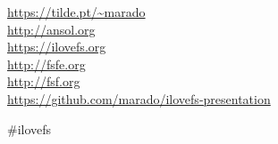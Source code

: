 \documentclass[landscape]{slides}
\begin{document}

\begin{slide}

\url{https://tilde.pt/~marado} \\
\url{http://ansol.org} \\
\url{https://ilovefs.org} \\
\url{http://fsfe.org} \\
\url{http://fsf.org} \\
\url{https://github.com/marado/ilovefs-presentation}

\#ilovefs
\end{slide}
\end{document}
